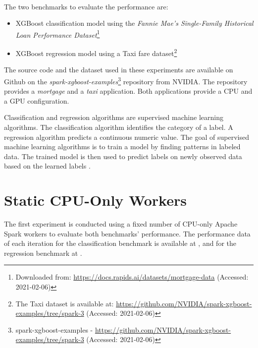 \paragraph{}
The two benchmarks to evaluate the performance are:
\begin{itemize}
\item XGBoost classification model using the \textit{Fannie Mae's Single-Family Historical Loan Performance Dataset}\footnote{Downloaded from: \url{https://docs.rapids.ai/datasets/mortgage-data} (Accessed: 2021-02-06)}\cite{Fannie2021Mortgage}

\item XGBoost regression model using a Taxi fare dataset\footnote{The Taxi dataset is available at: \url{https://github.com/NVIDIA/spark-xgboost-examples/tree/spark-3} (Accessed: 2021-02-06)}
\end{itemize}
The source code and the dataset used in these experiments are available on Github on the \textit{spark-xgboost-examples}\footnote{spark-xgboost-examples - \url{https://github.com/NVIDIA/spark-xgboost-examples/tree/spark-3} (Accessed: 2021-02-06)} repository from NVIDIA.
The repository provides a \textit{mortgage} and a \textit{taxi} application. Both applications provide a CPU and a GPU configuration.

Classification and regression algorithms are supervised machine learning algorithms.
The classification algorithm identifies the category of a label.
A regression algorithm predicts a continuous numeric value.
The goal of supervised machine learning algorithms is to train a model by finding patterns in labeled data. The trained model is then used to predict labels on newly observed data based on the learned labels \cite{Mcdonald2020SparkRapids}.


\section{Static CPU-Only Workers}
\label{sec:07_static}
The first experiment is conducted using a fixed number of CPU-only Apache Spark workers to evaluate both benchmarks' performance.
The performance data of each iteration for the classification benchmark is available at , and for the regression benchmark at .


